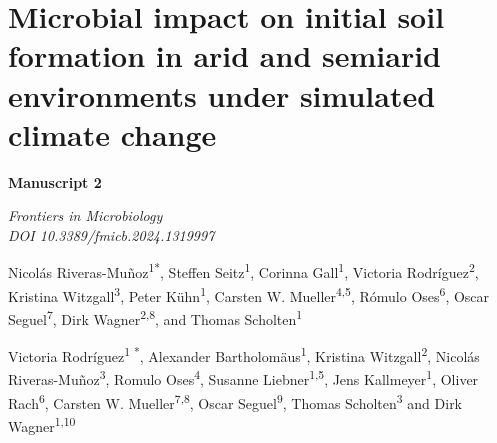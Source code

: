 \chapter{Microbial impact on initial soil formation in arid and semiarid environments under simulated climate change}
\label{chap:manuscript3} %

\begin{center}
    \textbf{\Large Manuscript 2}
  
    \vspace{0.3cm}
    \textit{Frontiers in Microbiology}\\
    \textit{DOI 10.3389/fmicb.2024.1319997}
    
    \vspace{0.5cm}
    
    Nicolás Riveras-Muñoz\textsuperscript{1*}, Steffen Seitz\textsuperscript{1}, Corinna Gall\textsuperscript{1}, Victoria Rodríguez\textsuperscript{2}, Kristina Witzgall\textsuperscript{3}, Peter Kühn\textsuperscript{1}, Carsten W. Mueller\textsuperscript{4,5}, Rómulo Oses\textsuperscript{6}, Oscar Seguel\textsuperscript{7}, Dirk Wagner\textsuperscript{2,8}, and Thomas Scholten\textsuperscript{1}

    Victoria Rodríguez\textsuperscript{1 *}, Alexander Bartholomäus\textsuperscript{1}, Kristina Witzgall\textsuperscript{2}, Nicolás Riveras-Muñoz\textsuperscript{3}, Romulo Oses\textsuperscript{4}, Susanne Liebner\textsuperscript{1,5}, Jens Kallmeyer\textsuperscript{1}, Oliver Rach\textsuperscript{6}, Carsten W. Mueller\textsuperscript{7,8}, Oscar Seguel\textsuperscript{9}, Thomas Scholten\textsuperscript{3} and Dirk Wagner\textsuperscript{1,10}

  
    \vspace{0.2cm}
  \end{center}
  
